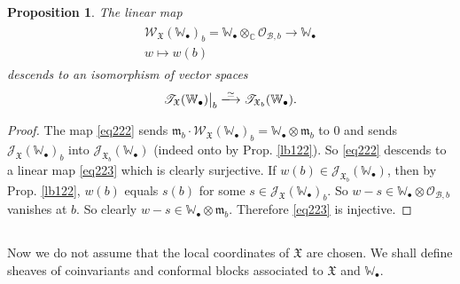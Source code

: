 \documentclass[12pt,a4paper,notitlepage]{article}
\theoremstyle{definition}
\theoremstyle{plain}
\newtheorem{pp}[df]{Proposition}
\newcommand{\fk}{\mathfrak}
\newcommand{\mc}{\mathcal}
\newcommand{\scr}{\mathscr}
\newcommand{\blt}{\bullet}
\newcommand{\Wbb}{\mathbb W}
\newcommand{\Cbb}{\mathbb C}
\numberwithin{equation}{section}
\begin{document}
\begin{pp}\label{lb134}
The linear map 
\begin{gather}\label{eq222}
\begin{gathered}
\scr W_{\fk X}(\Wbb_\blt)_b=\Wbb_\blt\otimes_\Cbb\scr O_{\mc B,b}\rightarrow \Wbb_\blt\\
w\mapsto w(b)
\end{gathered}
\end{gather}
descends to an isomorphism of vector spaces
\begin{align}\label{eq223}
\scr T_{\fk X}(\Wbb_\blt)\big|_b\xlongrightarrow{\simeq} \scr T_{\fk X_b}(\Wbb_\blt).
\end{align}
\end{pp}

\begin{proof}
The map \eqref{eq222} sends $\fk m_b\cdot \scr W_{\fk X}(\Wbb_\blt)_b=\Wbb_\blt\otimes \fk m_b$ to $0$ and sends $\scr J_{\fk X}(\Wbb_\blt)_b$ into $\scr J_{\fk X_b}(\Wbb_\blt)$ (indeed onto by Prop. \ref{lb122}). So \eqref{eq222} descends to a linear map \eqref{eq223} which is clearly surjective. If $w(b)\in\scr J_{\fk X_b}(\Wbb_\blt)$, then by Prop. \ref{lb122}, $w(b)$ equals $s(b)$ for some $s\in\scr J_{\fk X}(\Wbb_\blt)_b$. So $w-s\in\Wbb_\blt\otimes \scr O_{\mc B,b}$ vanishes at $b$. So clearly $w-s\in\Wbb_\blt\otimes \fk m_b$. Therefore \eqref{eq223} is injective.
\end{proof}



\subsection{}\label{lb190}

Now we do not assume that the local coordinates of $\fk X$ are chosen. We shall define sheaves of coinvariants and conformal blocks associated to $\fk X$ and $\Wbb_\blt$.
\end{document}
